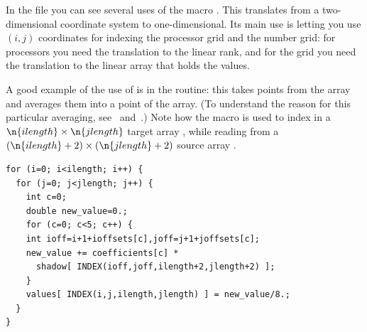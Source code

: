 In the file  you can see several uses of
the macro . This translates from a two-dimensional coordinate
system to one-dimensional. Its main use is letting you use $(i,j)$
coordinates for indexing the processor grid and the number grid: for
processors you need the translation to the linear rank, and for the
grid you need the translation to the linear array that holds the
values.

A good example of the use of  is in the
 routine: this takes points from the 
array and averages them into a point of the  array. (To
understand the reason for this particular averaging,
see~ and~.) Note how the
 macro is used to index in a
$\n{ilength}\times\n{jlength}$ target array , while
reading from a $(\n{ilength}+2)\times(\n{jlength}+2)$ source array
.
\begin{verbatim}
for (i=0; i<ilength; i++) {
  for (j=0; j<jlength; j++) {
    int c=0;
    double new_value=0.;
    for (c=0; c<5; c++) {
	int ioff=i+1+ioffsets[c],joff=j+1+joffsets[c];
	new_value += coefficients[c] * 
	  shadow[ INDEX(ioff,joff,ilength+2,jlength+2) ];
    }
    values[ INDEX(i,j,ilength,jlength) ] = new_value/8.;
  }
}
\end{verbatim}

